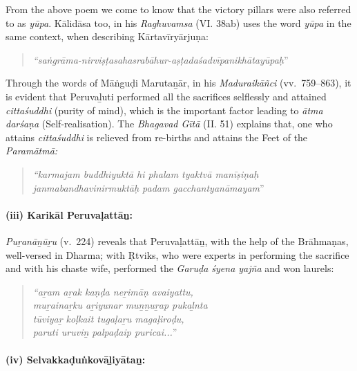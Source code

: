From the above poem we come to know that the victory pillars were also referred to as \textit{yūpa}. Kālidāsa too, in his \textit{Raghuvamsa} (VI. 38ab) uses the word \textit{yūpa} in the same context, when describing Kārtavīryārjuṇa:

\begin{quote}
\textit{“saṅgrāma-nirviṣṭasahasrabāhur-aṣṭadaśadvīpanikhātayūpaḥ}” 
\end{quote}

Through the words of Māṅguḍi Marutaṉār, in his \textit{Maduraikāñci} (vv.~759–863), it is evident that Peruvaḻuti performed all the sacrifices selflessly and attained \textit{cittaśuddhi} (purity of mind), which is the important factor leading to \textit{ātma darśaṇa} (Self-realisation). The \textit{Bhagavad Gītā} (II. 51) explains that, one who attains \textit{cittaśuddhi} is relieved from re-births and attains the Feet of the \textit{Paramātmā:}

\begin{quote}
\textit{“karmajam buddhiyuktā hi phalam tyaktvā manīṣiṇaḥ}\\\textit{janmabandhavinirmuktāḥ padam gacchantyanāmayam}”
\end{quote}


\paragraph*{(iii) Karikāl Peruvaḷattāṉ:}

\vskip -7pt

\textit{Puṟanāṉūṟu} (v.~224) reveals that Peruvaḷattāṉ, with the help of the Brāhmaṇas, well-versed in Dharma; with Ṛtviks, who were experts in performing the sacrifice and with his chaste wife, performed the \textit{Garuḍa śyena yajña} and won laurels:

\begin{quote}
\textit{“aṟam aṟak kaṇḍa neṟimāṇ avaiyattu,}\\\textit{muṟainaṟku aṟiyunar muṉṉuṟap pukaḻnta}\\\textit{tūviyaṟ koḷkait tugaḷaṟu magaḷiroḍu,}\\\textit{paruti uruviṉ palpaḍaip puricai...}”
\end{quote}


\paragraph*{(iv) Selvakkaḍuṅkovāḻiyātaṉ:}

\vskip -7pt

